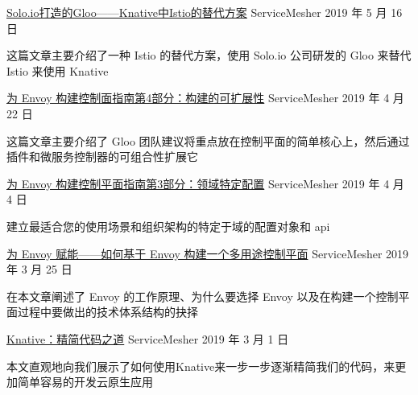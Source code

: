 

\begin{cventries}

    \cventry
    {}
    {\href{http://www.servicemesher.com/blog/gloo-by-solo-io-is-the-first-alternative-to-istio-on-knative/}{Solo.io打造的Gloo——Knative中Istio的替代方案}}
    {ServiceMesher}
    {2019 年 5 月 16 日}
    {
      \begin{cvitems} %
        \item {
          这篇文章主要介绍了一种 Istio 的替代方案，使用 Solo.io 公司研发的 Gloo 来替代 Istio 来使用 Knative
          }
        \end{cvitems}
    }

    \cventry
    {}
    {\href{http://www.servicemesher.com/blog/guidance-for-building-a-control-plane-for-envoy-part-4-build-for-extensibility/}{为 Envoy 构建控制面指南第4部分：构建的可扩展性}}
    {ServiceMesher}
    {2019 年 4 月 22 日}
    {
      \begin{cvitems} %
        \item {
          这篇文章主要介绍了 Gloo 团队建议将重点放在控制平面的简单核心上，然后通过插件和微服务控制器的可组合性扩展它 
        }
      \end{cvitems}
    }

    \cventry
    {}
    {\href{http://www.servicemesher.com/blog/guidance-for-building-a-control-plane-for-envoy-part-3-domain-specific-configuration/}{为 Envoy 构建控制平面指南第3部分：领域特定配置}}
    {ServiceMesher}
    {2019 年 4 月 4 日}
    {
      \begin{cvitems} %
        \item {
          建立最适合您的使用场景和组织架构的特定于域的配置对象和 api
        }
      \end{cvitems}
    }

    \cventry
    {}
    {\href{http://www.servicemesher.com/blog/building-a-control-plane-for-envoy/}{为 Envoy 赋能——如何基于 Envoy 构建一个多用途控制平面}}
    {ServiceMesher}
    {2019 年 3 月 25 日}
    {
      \begin{cvitems} %
        \item {
          在本文章阐述了 Envoy 的工作原理、为什么要选择 Envoy 以及在构建一个控制平面过程中要做出的技术体系结构的抉择
        }
      \end{cvitems}
    }

    \cventry
    {}
    {\href{http://www.servicemesher.com/blog/knative-whittling-down-the-code/}{Knative：精简代码之道}}
    {ServiceMesher}
    {2019 年 3 月 1 日}
    {
      \begin{cvitems} %
        \item 本文直观地向我们展示了如何使用Knative来一步一步逐渐精简我们的代码，来更加简单容易的开发云原生应用
      \end{cvitems}
    }
  
\end{cventries}

